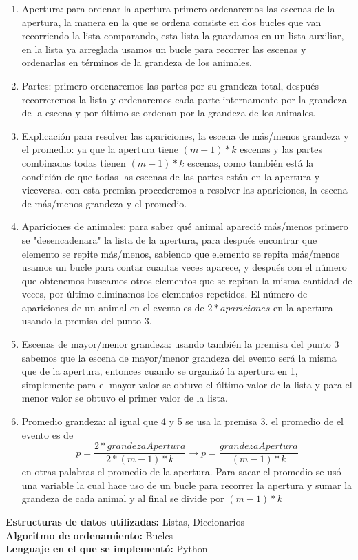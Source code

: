 \documentclass{article}
\begin{document}
			\begin{enumerate}
				\item Apertura: para ordenar la apertura primero ordenaremos las escenas de la apertura, la manera en la que se ordena consiste en dos bucles que van recorriendo la lista comparando, esta lista la guardamos en un lista auxiliar, en la lista ya arreglada usamos un bucle para recorrer las escenas y ordenarlas en términos de la grandeza de los animales.
				\item Partes: primero ordenaremos las partes por su grandeza total, después recorreremos la lista y ordenaremos cada parte internamente por la grandeza de la escena y por último se ordenan por la grandeza de los animales.
				\item Explicación para resolver las apariciones, la escena de más/menos grandeza y el promedio: ya que la apertura tiene $(m-1)*k$ escenas y las partes combinadas todas tienen $(m-1)*k$ escenas, como también está la condición de que todas las escenas de las partes están en la apertura y viceversa. con esta premisa procederemos a resolver las apariciones, la escena de más/menos grandeza y el promedio.
				\item Apariciones de animales: para saber qué animal apareció más/menos primero se "desencadenara" la lista de la apertura, para después encontrar que elemento se repite más/menos, sabiendo que elemento se repita más/menos usamos un bucle para contar cuantas veces aparece, y después con el número que obtenemos buscamos otros elementos que se repitan la misma cantidad de veces, por último eliminamos los elementos repetidos. El número de apariciones de un animal en el evento es de $2*apariciones$ en la apertura usando la premisa del punto 3.
				\item Escenas de mayor/menor grandeza: usando también la premisa del punto 3 sabemos que la escena de mayor/menor grandeza del evento será la misma que de la apertura, entonces cuando se organizó la apertura en 1, simplemente para el mayor valor se obtuvo el último valor de la lista y para el menor valor se obtuvo el primer valor de la lista.
				\item Promedio grandeza: al igual que 4 y 5 se usa la premisa 3. el  promedio de el evento es de 
				\begin{equation}
					p=\frac{2*grandezaApertura}{2*(m-1)*k} \rightarrow p=\frac{grandezaApertura}{(m-1)*k}
				\end{equation}
				en otras palabras el promedio de la apertura. Para sacar el promedio se usó una variable la cual hace uso de un bucle para recorrer la apertura y sumar la grandeza de cada animal y al final se divide por $(m-1)*k$
			\end{enumerate}
			\textbf{Estructuras de datos utilizadas:} Listas, Diccionarios\\ 
			\textbf{Algoritmo de ordenamiento:} Bucles\\
			\textbf{Lenguaje en el que se implementó:} Python
		
\end{document}
